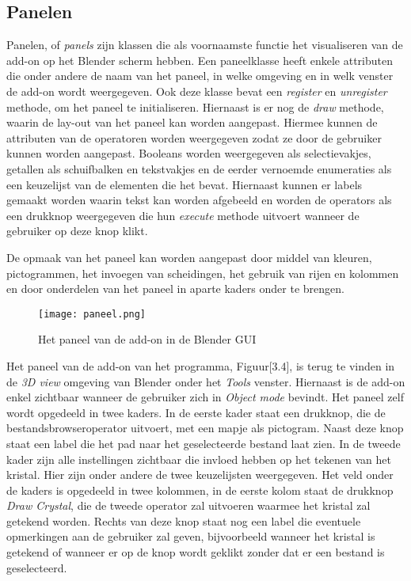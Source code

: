 \subsection{Panelen}
Panelen, of \textit{panels} zijn klassen die als voornaamste functie het visualiseren van de add-on op het Blender scherm hebben. Een paneelklasse heeft enkele attributen die onder andere de naam van het paneel, in welke omgeving en in welk venster de add-on wordt weergegeven. Ook deze klasse bevat een \textit{register} en \textit{unregister} methode, om het paneel te initialiseren. Hiernaast is er nog de \textit{draw} methode, waarin de lay-out van het paneel kan worden aangepast. Hiermee kunnen de attributen van de operatoren worden weergegeven zodat ze door de gebruiker kunnen worden aangepast. Booleans worden weergegeven als selectievakjes, getallen als schuifbalken en tekstvakjes en de eerder vernoemde enumeraties als een keuzelijst van de elementen die het bevat. Hiernaast kunnen er labels gemaakt worden waarin tekst kan worden afgebeeld en worden de operators als een drukknop weergegeven die hun \textit{execute} methode uitvoert wanneer de gebruiker op deze knop klikt.
\par
De opmaak van het paneel kan worden aangepast door middel van kleuren, pictogrammen, het invoegen van scheidingen, het gebruik van rijen en kolommen en door onderdelen van het paneel in aparte kaders onder te brengen.
\par
\begin{figure}[H]
\texttt{[image: paneel.png]}
\caption{Het paneel van de add-on in de Blender GUI}
\end{figure}

\newpage
Het paneel van de add-on van het programma, Figuur[3.4], is terug te vinden in de \textit{3D view} omgeving van Blender onder het \textit{Tools} venster. Hiernaast is de add-on enkel zichtbaar wanneer de gebruiker zich in \textit{Object mode} bevindt. Het paneel zelf wordt opgedeeld in twee kaders. In de eerste kader staat een drukknop, die de bestandsbrowseroperator uitvoert, met een mapje als pictogram. Naast deze knop staat een label die het pad naar het geselecteerde bestand laat zien. In de tweede kader zijn alle instellingen zichtbaar die invloed hebben op het tekenen van het kristal. Hier zijn onder andere de twee keuzelijsten weergegeven.  Het veld onder de kaders is opgedeeld in twee kolommen, in de eerste kolom staat de drukknop \textit{Draw Crystal}, die de tweede operator zal uitvoeren waarmee het kristal zal getekend worden. Rechts van deze knop staat nog een label die eventuele opmerkingen aan de gebruiker zal geven, bijvoorbeeld wanneer het kristal is getekend of wanneer er op de knop wordt geklikt zonder dat er een bestand is geselecteerd.




